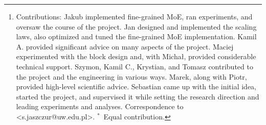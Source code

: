 \begin{abstract}

Mixture of Experts (MoE) models have emerged as a primary solution for reducing the computational cost of Large Language Models. In this work, we analyze their scaling properties, incorporating an expanded range of variables.  Specifically, we introduce a new hyperparameter, granularity, whose adjustment enables precise control over the size of the experts. Building on this, 
we establish scaling laws for fine-grained MoE, taking into account the number of training tokens, model size, and granularity.  Leveraging these laws, we derive the optimal training configuration for a given computational budget. Our findings not only show that MoE models consistently outperform dense Transformers but also highlight that the efficiency gap between dense and MoE models widens as we scale up the model size and training budget. Furthermore, we demonstrate that the common practice of setting the size of experts in MoE to mirror the \ff{} layer is not optimal at almost any computational budget. 
\noindent\let\thefootnote\relax\footnote{Contributions: Jakub implemented fine-grained MoE, ran experiments, and oversaw the course of the project. Jan designed and implemented the scaling laws, also optimized and tuned the fine-grained MoE implementation.
Kamil A. provided significant advice on many aspects of the project. Maciej experimented with the block design and, with Michał, provided considerable technical support. Szymon, Kamil C., Krystian, and Tomasz contributed to the project and the engineering in various ways. Marek, along with Piotr, provided high-level scientific advice. Sebastian came up with the initial idea, started the project, and supervised it while setting the research direction and leading experiments and analyses. Correspondence to \textless{}s.jaszczur@uw.edu.pl\textgreater{}. $^{\ast}$~Equal contribution. 
}


\end{abstract}
